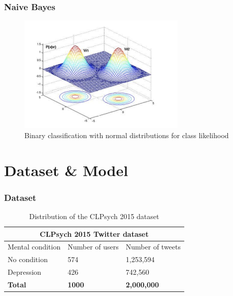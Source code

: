 \documentclass{beamer}
\begin{document}
\begin{frame}
	\frametitle{Naive Bayes}	
	\begin{figure}[h]
		\centering
		\includegraphics[width=8cm]{bayes}
		\caption{Binary classification with normal distributions for class likelihood}
	\end{figure}
\end{frame}

\section{Dataset  \& Model}

\begin{frame}
	\frametitle{Dataset}	
	
		\begin{table}[h!]
			\centering
			\begin{tabular}{|p{3cm}|p{3cm}|p{3cm}|} 
				\hline
				\multicolumn{3}{|c|}{CLPsych 2015 Twitter dataset}\\
				\hline
				Mental condition & Number of users & Number of tweets \\ [0.5ex] 
				\hline
				No condition & 574 & 1,253,594 \\ 
				Depression & 426 & 742,560 \\
				\hline
				\textbf{Total} & \textbf{1000} & \textbf{2,000,000}\\
				\hline
			\end{tabular}
			\caption{Distribution of the CLPsych 2015 dataset}
			\label{Table:1}
		\end{table}
	
\end{frame}
\end{document}

